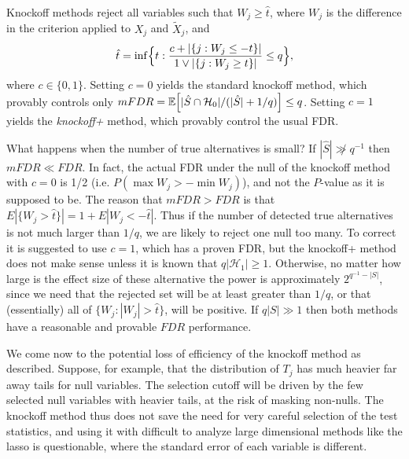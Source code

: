 \documentclass[article,lineno]{biometrika}
\begin{document}
	Knockoff methods reject all variables such that $W_j\ge \hat t$, where $W_j$ is the difference in the criterion applied to $X_j$ and $\tilde X_j$, and
	\begin{equation*}
		\hat t = \inf\Bigl\{t: \frac{c+|\{j: W_j\le -t\}|}{1\vee|\{j: W_j\ge t\}|}\leq q\Bigr\},
	\end{equation*}
	where $c\in\{0,1\}$.
	Setting $c=0$ yields the standard knockoff method, which provably controls only $mFDR=\mathbb{E} \Bigl[|\hat S\cap {\mathcal H}_0|/(|\hat S|+1/q)\Bigr]\le q$.
	Setting $c=1$ yields the \emph{knockoff+} method, which provably control the usual FDR.
	
	What happens when the number of true alternatives is small?
	If $|\hat S|\not\gg q^{-1}$ then $mFDR \ll FDR$.
	In fact, the actual FDR under the null of the knockoff method with $c=0$ is 1/2 (i.e. $P(\max W_j> -\min W_j)$), and not the $P$-value as it is supposed to be. The reason that $mFDR>FDR$ is that $E|\{W_j>\hat t\}|=1+E |W_j<-\hat t|$. Thus if the number of detected true alternatives is not much larger than $1/q$, we are likely to reject one null too many. To correct it is suggested to use $c=1$, which has a proven FDR, but the knockoff+ method does not make sense unless it is known that $q|{\mathcal H}_1|\ge 1$. Otherwise, no matter how large is the effect size of these alternative the power is approximately $2^{q^{-1}-|S|}$, since we need that the rejected set will be at least greater than $1/q$, or that (essentially) all of $\{W_j: |W_j|>\hat t\}$, will be positive.
	If $q|S|\gg 1$ then both methods have a reasonable and provable $FDR$ performance.
	
	We come now to the potential loss of efficiency of the knockoff method as described.
	Suppose, for example, that the distribution of $T_j$ has much heavier far away tails for null variables.
	The selection cutoff will be driven by the few selected null variables with heavier tails, at the risk of masking non-nulls.
	The knockoff method thus does not save the need for very careful selection of the test statistics, and using it with difficult to analyze large dimensional methods like the lasso is questionable, where the standard error of each variable is different.
	
\end{document}
